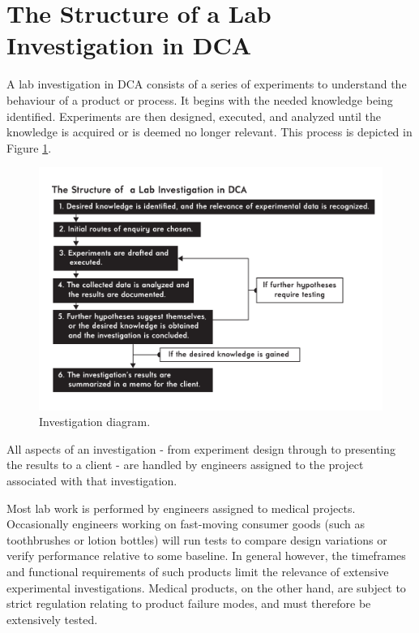 \documentclass[11pt,a4paper,article]{memoir} %
\begin{document}
\section{The Structure of a Lab Investigation in DCA}
A lab investigation in DCA consists of a series of experiments to understand the behaviour of a product or process. It begins with the needed knowledge being identified. Experiments are then designed, executed, and analyzed until the knowledge is acquired or is deemed no longer relevant. This process is depicted in Figure \ref{fig:investigation_diagram}.
\begin{figure}[h!]
\centering
\includegraphics[width=1.2\textwidth]{Lab_Investigation_Diagram.pdf}
\caption{Investigation diagram.}
\label{fig:investigation_diagram}
\end{figure}
All aspects of an investigation - from experiment design through to presenting the results to a client - are handled by engineers assigned to the project associated with that investigation. 
\par
Most lab work is performed by engineers assigned to medical projects. Occasionally engineers working on fast-moving consumer goods (such as toothbrushes or lotion bottles) will run tests to compare design variations or verify performance relative to some baseline. In general however, the timeframes and functional requirements of such products limit the relevance of extensive experimental investigations. Medical products, on the other hand, are subject to strict regulation relating to product failure modes, and must therefore be extensively tested.
\par
\end{document}
